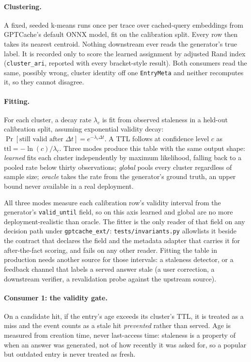 \documentclass[10pt]{article}
\begin{document}
\paragraph{Clustering.} A fixed, seeded k-means runs once per trace over cached-query
embeddings from GPTCache's default ONNX model, fit on the calibration split. Every row then
takes its nearest centroid. Nothing downstream ever reads the generator's true label. It is
recorded only to score the learned assignment by adjusted Rand index
(\texttt{cluster\_ari}, reported with every bracket-style result). Both consumers read the
same, possibly wrong, cluster identity off one \texttt{EntryMeta} and neither recomputes it,
so they cannot disagree.

\paragraph{Fitting.} For each cluster, a decay rate $\lambda_c$ is fit from observed
staleness in a held-out calibration split, assuming exponential validity decay:
$\Pr[\text{still valid after } \Delta t] = e^{-\lambda_c \Delta t}$. A TTL follows at
confidence level $c$ as $\text{ttl} = -\ln(c) / \lambda_c$. Three modes produce this table
with the same output shape: \emph{learned} fits each cluster independently by maximum
likelihood, falling back to a pooled rate below thirty observations; \emph{global} pools
every cluster regardless of sample size; \emph{oracle} takes the rate from the generator's
ground truth, an upper bound never available in a real deployment.

All three modes measure each calibration row's validity interval from the generator's
\texttt{valid\_until} field, so on this axis learned and global are no more
deployment-realistic than oracle. The fitter is the only reader of that field on any
decision path under \texttt{gptcache\_ext/}: \texttt{tests/invariants.py} allowlists it
beside the contract that declares the field and the metadata adapter that carries it for
after-the-fact scoring, and fails on any other reader.
Fitting the table in production needs another source for those intervals: a staleness
detector, or a feedback channel that labels a served answer stale (a user correction, a
downstream verifier, a revalidation probe against the upstream source).

\paragraph{Consumer 1: the validity gate.} On a candidate hit, if the entry's age exceeds
its cluster's TTL, it is treated as a miss and the event counts as a stale hit
\emph{prevented} rather than served. Age is measured from creation time, never last-access
time: staleness is a property of when an answer was generated, not of how recently it was
asked for, so a popular but outdated entry is never treated as fresh.
\end{document}
